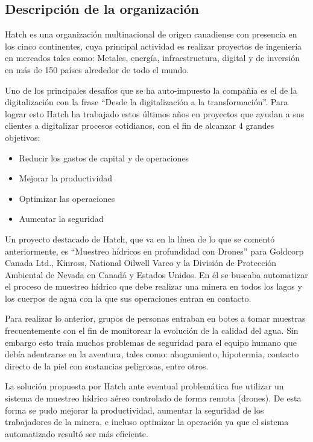 \subsection{Descripción de la organización}
Hatch es una organización multinacional de origen canadiense con presencia en los cinco continentes, cuya principal actividad es realizar proyectos de ingeniería en mercados tales como: Metales, energía, infraestructura, digital y de inversión en más de 150 países alrededor de todo el mundo.

Uno de los principales desafíos que se ha auto-impuesto la compañía es el de la digitalización con la frase “Desde la digitalización a la transformación”. Para lograr esto Hatch ha trabajado estos últimos años en proyectos que ayudan a sus clientes a digitalizar procesos cotidianos, con el fin de alcanzar 4 grandes objetivos:

\begin{itemize}
    \item Reducir los gastos de capital y de operaciones
    \item Mejorar la productividad
    \item Optimizar las operaciones
    \item Aumentar la seguridad
\end{itemize}

Un proyecto destacado de Hatch, que va en la línea de lo que se comentó anteriormente, es “Muestreo hídricos en profundidad con Drones” para Goldcorp Canada Ltd., Kinross, National Oilwell Varco y la División de Protección Ambiental de Nevada en Canadá y Estados Unidos. En él se buscaba automatizar el proceso de muestreo hídrico que debe realizar una minera en todos los lagos y los cuerpos de agua con la que sus operaciones entran en contacto. 

Para realizar lo anterior, grupos de personas entraban en botes a tomar muestras frecuentemente con el fin de monitorear la evolución de la calidad del agua. Sin embargo esto traía muchos problemas de seguridad para el equipo humano que debía adentrarse en la aventura, tales como: ahogamiento, hipotermia, contacto directo de la piel con sustancias peligrosas, entre otros. 

La solución propuesta por Hatch ante eventual problemática fue utilizar un sistema de muestreo hídrico aéreo controlado de forma remota (drones). De esta forma se pudo mejorar la productividad, aumentar la seguridad de los trabajadores de la minera, e incluso optimizar la operación ya que el sistema automatizado resultó ser más eficiente.

